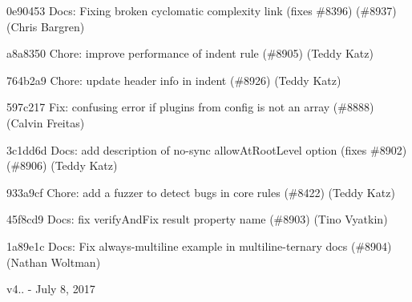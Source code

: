 \begin{DoxyItemize}
\item 0e90453 Docs\+: Fixing broken cyclomatic complexity link (fixes \#8396) (\#8937) (Chris Bargren)
\item a8a8350 Chore\+: improve performance of {\ttfamily indent} rule (\#8905) (Teddy Katz)
\item 764b2a9 Chore\+: update header info in {\ttfamily indent} (\#8926) (Teddy Katz)
\item 597c217 Fix\+: confusing error if plugins from config is not an array (\#8888) (Calvin Freitas)
\item 3c1dd6d Docs\+: add description of no-\/sync {\ttfamily allow\+At\+Root\+Level} option (fixes \#8902) (\#8906) (Teddy Katz)
\item 933a9cf Chore\+: add a fuzzer to detect bugs in core rules (\#8422) (Teddy Katz)
\item 45f8cd9 Docs\+: fix verify\+And\+Fix result property name (\#8903) (Tino Vyatkin)
\item 1a89e1c Docs\+: Fix always-\/multiline example in multiline-\/ternary docs (\#8904) (Nathan Woltman)
\end{DoxyItemize}

v4.. -\/ July 8, 2017


